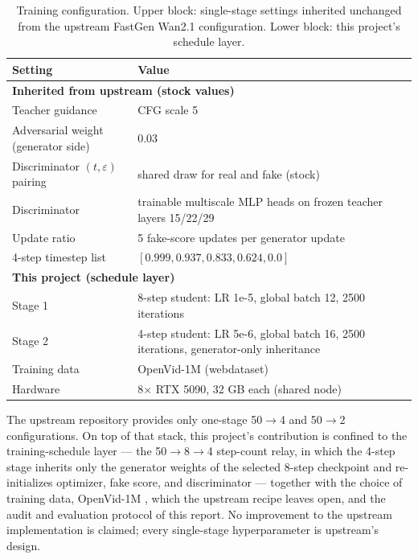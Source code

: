 \documentclass[11pt,a4paper]{article}
\begin{document}
\begin{table}[htbp]
  \centering
  \footnotesize
  \setlength{\tabcolsep}{4pt}
  \begin{tabular}{lp{9.5cm}}
    \toprule
    Setting & Value \\
    \midrule
    \multicolumn{2}{l}{\textbf{Inherited from upstream (stock values)}} \\
    \midrule
    Teacher guidance & CFG scale 5 \\
    Adversarial weight (generator side) & 0.03 \\
    Discriminator $(t, \varepsilon)$ pairing & shared draw for real and fake (stock) \\
    Discriminator & trainable multiscale MLP heads on frozen teacher layers 15/22/29 \\
    Update ratio & 5 fake-score updates per generator update \\
    4-step timestep list & $[0.999, 0.937, 0.833, 0.624, 0.0]$ \\
    \midrule
    \multicolumn{2}{l}{\textbf{This project (schedule layer)}} \\
    \midrule
    Stage 1 & 8-step student: LR 1e-5, global batch 12, 2500 iterations \\
    Stage 2 & 4-step student: LR 5e-6, global batch 16, 2500 iterations, generator-only inheritance \\
    Training data & OpenVid-1M (webdataset) \\
    Hardware & 8$\times$ RTX 5090, 32 GB each (shared node) \\
    \bottomrule
  \end{tabular}
  \caption{Training configuration. Upper block: single-stage settings inherited unchanged from the upstream FastGen Wan2.1 configuration. Lower block: this project's schedule layer.}
  \label{tab:config}
\end{table}

The upstream repository provides only one-stage 50$\to$4 and 50$\to$2 configurations. On top of that stack, this project's contribution is confined to the training-schedule layer — the 50$\to$8$\to$4 step-count relay, in which the 4-step stage inherits only the generator weights of the selected 8-step checkpoint and re-initializes optimizer, fake score, and discriminator — together with the choice of training data, OpenVid-1M \cite{openvid}, which the upstream recipe leaves open, and the audit and evaluation protocol of this report. No improvement to the upstream implementation is claimed; every single-stage hyperparameter is upstream's design.
\end{document}
